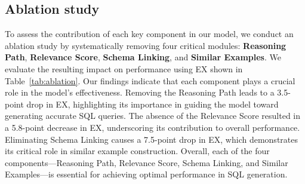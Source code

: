 

\subsection{Ablation study}
To assess the contribution of each key component in our model, we conduct an ablation study by systematically removing four critical modules: \textbf{Reasoning Path}, \textbf{Relevance Score}, \textbf{Schema Linking}, and \textbf{Similar Examples}.  We evaluate the resulting impact on performance using EX shown in Table~\ref{tab:ablation}. Our findings indicate that each component plays a crucial role in the model’s effectiveness. Removing the Reasoning Path leads to a 3.5-point drop in EX, highlighting its importance in guiding the model toward generating accurate SQL queries. The absence of the Relevance Score resulted in a 5.8-point decrease in EX, underscoring its contribution to overall performance. Eliminating Schema Linking causes a 7.5-point drop in EX, which demonstrates its critical role in similar example construction. Overall, each of the four components—Reasoning Path, Relevance Score, Schema Linking, and Similar Examples—is essential for achieving optimal performance in SQL generation.
